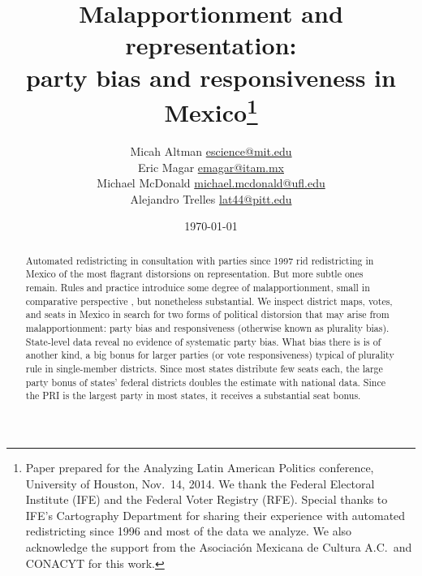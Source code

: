 \documentclass[letter,12pt]{article}
\begin{document}
\title{Malapportionment and representation: \\ party bias and responsiveness in Mexico\thanks{Paper prepared for the Analyzing Latin American Politics conference, University of Houston, Nov.~14, 2014. We thank the Federal Electoral Institute (IFE) and the Federal Voter Registry (RFE). Special thanks to IFE's Cartography Department for sharing their experience with automated redistricting since 1996 and most of the data we analyze. We also acknowledge the support from the Asociaci\'on Mexicana de Cultura A.C.\ and CONACYT for this work.}}
\author{Micah Altman {\small \url{escience@mit.edu}} \\
        Eric Magar {\small \url{emagar@itam.mx}} \\
        Michael McDonald {\small \url{michael.mcdonald@ufl.edu}} \\  %
        Alejandro Trelles {\small \url{lat44@pitt.edu}}
      }
\date{\today}
\maketitle


\begin{abstract}
\noindent Automated redistricting in consultation with parties since 1997 rid redistricting in Mexico of the most flagrant distorsions on representation. But more subtle ones remain. Rules and practice introduice some degree of malapportionment, small in comparative perspective \citep{samuels.snyder.2001}, but nonetheless substantial. We inspect district maps, votes, and seats in Mexico in search for two forms of political distorsion that may arise from malapportionment: party bias and responsiveness (otherwise known as plurality bias). State-level data reveal no evidence of systematic party bias. What bias there is is of another kind, a big bonus for larger parties (or vote responsiveness) typical of plurality rule in single-member districts. Since most states distribute few seats each, the large party bonus of states' federal districts doubles the estimate with national data. Since the PRI is the largest party in most states, it receives a substantial seat bonus.
\end{abstract}

\end{document}
